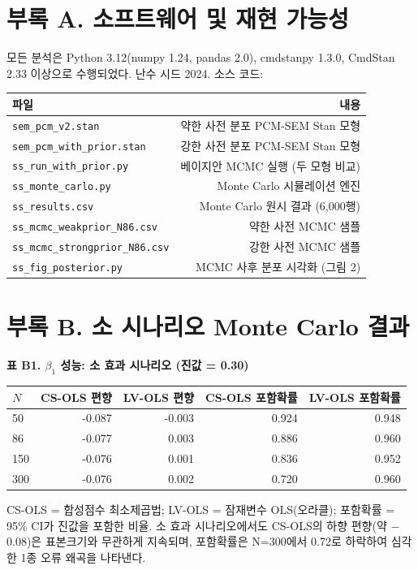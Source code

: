 \documentclass[a4paper,10pt]{oblivoir}
\begin{document}
\section{부록 A. 소프트웨어 및 재현 가능성}

모든 분석은 Python 3.12(numpy 1.24, pandas 2.0), cmdstanpy 1.3.0, CmdStan 2.33 이상으로 수행되었다. 난수 시드 2024. 소스 코드:

\begin{table}[htbp]
\centering
\small
\begin{tabular}{lr}
\toprule
파일 & 내용 \\
\midrule
\texttt{sem\_pcm\_v2.stan} & 약한 사전 분포 PCM-SEM Stan 모형 \\
\texttt{sem\_pcm\_with\_prior.stan} & 강한 사전 분포 PCM-SEM Stan 모형 \\
\texttt{ss\_run\_with\_prior.py} & 베이지안 MCMC 실행 (두 모형 비교) \\
\texttt{ss\_monte\_carlo.py} & Monte Carlo 시뮬레이션 엔진 \\
\texttt{ss\_results.csv} & Monte Carlo 원시 결과 (6,000행) \\
\texttt{ss\_mcmc\_weakprior\_N86.csv} & 약한 사전 MCMC 샘플 \\
\texttt{ss\_mcmc\_strongprior\_N86.csv} & 강한 사전 MCMC 샘플 \\
\texttt{ss\_fig\_posterior.py} & MCMC 사후 분포 시각화 (그림 2) \\
\bottomrule
\end{tabular}
\end{table}

\section{부록 B. 소 시나리오 Monte Carlo 결과}


\noindent\textbf{표 B1. $\beta_1$ 성능: 소 효과 시나리오 (진값 = 0.30)}


\begin{table}[htbp]
\centering
\small
\begin{tabular}{lrrrr}
\toprule
$N$ & CS-OLS 편향 & LV-OLS 편향 & CS-OLS 포함확률 & LV-OLS 포함확률 \\
\midrule
50 & -0.087 & -0.003 & 0.924 & 0.948 \\
86 & -0.077 & 0.003 & 0.886 & 0.960 \\
150 & -0.076 & 0.001 & 0.836 & 0.952 \\
300 & -0.076 & 0.002 & 0.720 & 0.960 \\
\bottomrule
\end{tabular}
\end{table}

CS-OLS = 합성점수 최소제곱법; LV-OLS = 잠재변수 OLS(오라클); 포함확률 = 95\% CI가 진값을 포함한 비율.
소 효과 시나리오에서도 CS-OLS의 하향 편향(약 \ensuremath{-}0.08)은 표본크기와 무관하게 지속되며, 포함확률은 N=300에서 0.72로 하락하여 심각한 1종 오류 왜곡을 나타낸다.
\end{document}
